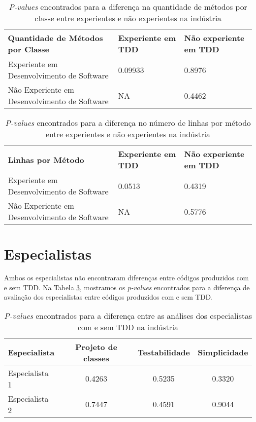 \begin{table}[h!]
	\centering
	\begin{tabular}{ | p{5cm} | p{5cm} | p{5cm} | }
		\hline
		 \textbf{Quantidade de Métodos por Classe} & \textbf{Experiente em TDD} & \textbf{Não experiente em TDD} \\
		\hline
			Experiente em Desenvolvimento de Software 		& 0.09933	&	0.8976\\
			\hline
			Não Experiente em Desenvolvimento de Software 	& NA		&	0.4462\\
		\hline
	\end{tabular}
	\caption{\textit{P-values} encontrados para a diferença na quantidade de métodos por classe entre experientes e não experientes na indústria}
	\label{valores-exp-metodos-industria}
\end{table}

\begin{table}[h!]
	\centering
	\begin{tabular}{ | p{5cm} | p{5cm} | p{5cm} | }
		\hline
		 \textbf{Linhas por Método} & \textbf{Experiente em TDD} & \textbf{Não experiente em TDD} \\
		\hline
			Experiente em Desenvolvimento de Software 		& 0.0513	&	0.4319\\
			\hline
			Não Experiente em Desenvolvimento de Software 	& NA		&	0.5776\\
		\hline
	\end{tabular}
	\caption{\textit{P-values} encontrados para a diferença no número de linhas por método entre experientes e não experientes na indústria}
	\label{valores-exp-linhas-industria}
\end{table}

\newpage
\section{Especialistas}

Ambos os especialistas não encontraram diferenças entre códigos produzidos
com e sem TDD. Na Tabela
\ref{tab:especialistas-industria},
mostramos os \textit{p-values} encontrados para a diferença de avaliação dos especialistas
entre códigos produzidos com e sem TDD.


\begin{table}[h!]
	\centering
	\begin{tabular}{| p{5cm} | c | c | c | }
		\hline
		\textbf{Especialista} & \textbf{Projeto de classes} & \textbf{Testabilidade} & \textbf{Simplicidade}\\
		\hline
		Especialista 1 &	0.4263 &	0.5235 &	0.3320\\
		Especialista 2 &	0.7447 &	0.4591 &	0.9044\\
		\hline
	\end{tabular}
	\caption{\textit{P-values} encontrados para a diferença entre as análises dos especialistas com e sem TDD na indústria}
	\label{tab:especialistas-industria}
\end{table}

